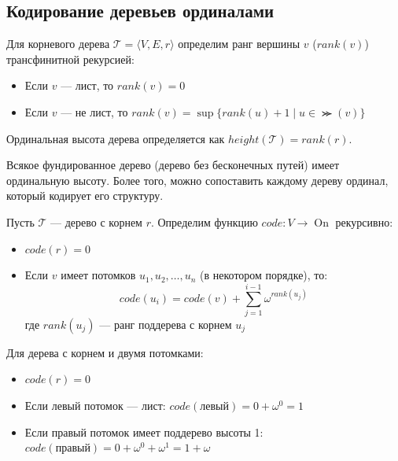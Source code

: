 \documentclass[11pt, a4paper]{extarticle}
\newcommand{\Tcal}{{\mathcal T}}
\newcommand{\On}{\mathop{\mathrm{On}}}
\begin{document}
\subsection{Кодирование деревьев ординалами}

\begin{definition}
Для корневого дерева $\Tcal = \langle V, E, r \rangle$ определим ранг вершины $v$ ($rank(v)$) трансфинитной рекурсией:
\begin{itemize}
    \item Если $v$ --- лист, то $rank(v) = 0$
    \item Если $v$ --- не лист, то $rank(v) = \sup \{rank(u) + 1 \mid u \in \Succ(v)\}$
\end{itemize}
Ординальная высота дерева определяется как $height(\Tcal) = rank(r)$.
\end{definition}

\begin{theorem}
Всякое фундированное дерево (дерево без бесконечных путей) имеет ординальную высоту. Более того, можно сопоставить каждому дереву ординал, который кодирует его структуру.
\end{theorem}

\begin{definition}
Пусть $\Tcal$ --- дерево с корнем $r$. Определим функцию $code: V \to \On$ рекурсивно:
\begin{itemize}
    \item $code(r) = 0$
    \item Если $v$ имеет потомков $u_1, u_2, \ldots, u_n$ (в некотором порядке), то:
    $$code(u_i) = code(v) + \sum_{j=1}^{i-1} \omega^{rank(u_j)}$$
    где $rank(u_j)$ --- ранг поддерева с корнем $u_j$
\end{itemize}
\end{definition}

\begin{example}
Для дерева с корнем и двумя потомками:
\begin{itemize}
    \item $code(r) = 0$
    \item Если левый потомок --- лист: $code(\text{левый}) = 0 + \omega^0 = 1$
    \item Если правый потомок имеет поддерево высоты 1: $code(\text{правый}) = 0 + \omega^0 + \omega^1 = 1 + \omega$
\end{itemize}
\end{example}
\end{document}
